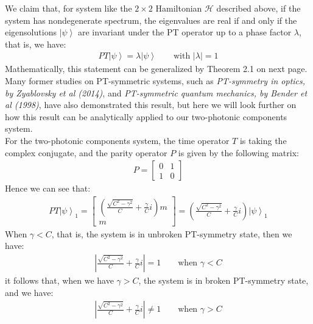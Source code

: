 \documentclass[11pt]{book}
\theoremstyle{break}
\theoremstyle{break}
\newcommand{\bmat}[1]{\begin{bmatrix} #1 \end{bmatrix}}
\begin{document}
We claim that, for system like the $2\times 2$ Hamiltonian 
$\mathcal{H}$ described above, if the system has nondegenerate spectrum,  the eigenvalues are real if and only if the eigensolutions $ \left|\psi\right>$ are invariant under the PT operator up to a phase factor $\lambda$, that is, we have:
\begin{align*}
PT \left|\psi\right> = \lambda \left|\psi\right> \qquad \text{with }|\lambda | =1  \tag{in unbroken PT-symmetric phase}
\end{align*}
Mathematically, this statement can be generalized by Theorem 2.1 on next page. Many former studies on PT-symmetric systems, such as \textit{PT-symmetry in optics, by Zyablovsky et al (2014)}, and \textit{PT-symmetric quantum mechanics, by Bender et al (1998)}, have also demonstrated this result, but here we will look further on how this result can be analytically applied to our two-photonic components system.\\

For the two-photonic components system, the time operator $T$ is taking the complex conjugate, and the parity operator $P$ is given by the following matrix:
\begin{align*}
P = \bmat{0 & 1 \\ 1 & 0}
\end{align*}
Hence we can see that:
\begin{align*}
PT \left|\psi\right>_1 = \bmat{\left(\frac{\sqrt{C^2 - \gamma^2}}{C}+\frac{\gamma}{C}i\right)m \\ m} = \left(\frac{\sqrt{C^2 - \gamma^2}}{C}+\frac{\gamma}{C}i\right) \left|\psi\right>_1
\end{align*}
When $\gamma< C$, that is, the system is in unbroken PT-symmetry state, then we have:
\begin{align*}
\left| \frac{\sqrt{C^2 - \gamma^2}}{C}+\frac{\gamma}{C}i \right| = 1 \qquad \text{when }\gamma<C
\end{align*}
it follows that, when we have $\gamma > C$, the system is in broken PT-symmetry state, and we have:
\begin{align*}
\left| \frac{\sqrt{C^2 - \gamma^2}}{C}+\frac{\gamma}{C}i \right| \neq 1 \qquad \text{when }\gamma > C
\end{align*}
\end{document}
